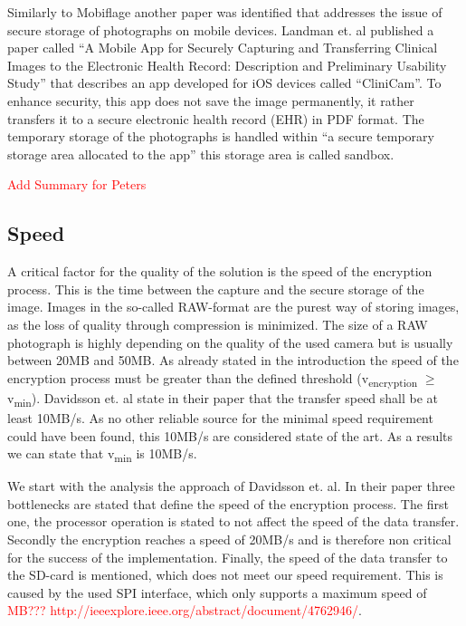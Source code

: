 \documentclass[12pt,a4paper,titlepage,oneside]{scrartcl}
\newcommand\todo[1]{\textcolor{red}{#1}}
\begin{document}
Similarly to Mobiflage another paper was identified that addresses the issue of secure storage of photographs on mobile devices.
Landman et. al \cite{pmid25565678} published a paper called ``A Mobile App for Securely Capturing and Transferring Clinical Images to the Electronic Health Record: Description and Preliminary Usability Study'' that describes an app developed for iOS devices called ``CliniCam''.
To enhance security, this app does not save the image permanently, it rather transfers it to a secure electronic health record (EHR) in PDF format.
The temporary storage of the photographs is handled within ``a secure temporary storage area allocated to the app'' this storage area is called sandbox.

\todo{Add Summary for Peters}

\subsection{Speed}
A critical factor for the quality of the solution is the speed of the encryption process.
This is the time between the capture and the secure storage of the image.
Images in the so-called RAW-format are the purest way of storing images, as the loss of quality through compression is minimized.
The size of a RAW photograph is highly depending on the quality of the used camera but is usually between 20MB and 50MB.
As already stated in the introduction the speed of the encryption process must be greater than the defined threshold (v\textsubscript{encryption} $\geq$ v\textsubscript{min}).
Davidsson et. al \cite{Davidsson2016} state in their paper that the transfer speed shall be at least 10MB/s.
As no other reliable source for the minimal speed requirement could have been found, this 10MB/s are considered state of the art.
As a results we can state that v\textsubscript{min} is 10MB/s.

We start with the analysis the approach of Davidsson et. al.
In their paper three bottlenecks are stated that define the speed of the encryption process.
The first one, the processor operation is stated to not affect the speed of the data transfer.
Secondly the encryption reaches a speed of 20MB/s and is therefore non critical for the success of the implementation.
Finally, the speed of the data transfer to the SD-card is mentioned, which does not meet our speed requirement.
This is caused by the used SPI interface, which only supports a maximum speed of \todo{MB??? http://ieeexplore.ieee.org/abstract/document/4762946/}.
\end{document}
